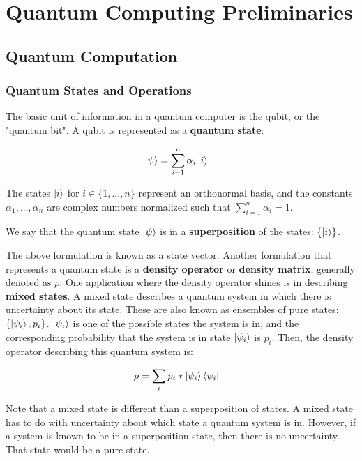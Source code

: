 \chapter{Quantum Computing Preliminaries}
\label{ch:qc-prelim}

\section{Quantum Computation}
\label{sec:qc}

\subsection{Quantum States and Operations}

The basic unit of information in a quantum computer is the qubit, or the "quantum bit". A qubit is represented as a \textbf{quantum state}:

\begin{align}
    \ket{\psi} &= \sum_{i=1}^n \alpha_i\ket{i}
\end{align}

The states $\ket{i}$ for $i \in \{1,...,n\}$ represent an orthonormal basis, and the constants $\alpha_1,...,\alpha_n$ are complex numbers normalized such that $\sum_{i=1}^n \alpha_i = 1$.

We say that the quantum state $\ket{\psi}$ is in a \textbf{superposition} of the states: $\{\ket{i}\}$.


The above formulation is known as a state vector. Another formulation that represents a quantum state is a \textbf{density operator} or \textbf{density matrix}, generally denoted as $\rho$. One application where the density operator shines is in describing \textbf{mixed states}. A mixed state describes a quantum system in which there is uncertainty about its state. These are also known as ensembles of pure states: $\{\ket{\psi_i}, p_i\}$. $\ket{\psi_i}$ is one of the possible states the system is in, and the corresponding probability that the system is in state $\ket{\psi_i}$ is $p_i$. Then, the density operator describing this quantum system is:

\begin{align}
    \rho &= \sum_{i} p_i * \ket{\psi_i}\bra{\psi_i}
\end{align}

Note that a mixed state is different than a superposition of states. A mixed state has to do with uncertainty about which state a quantum system is in. However, if a system is known to be in a superposition state, then there is no uncertainty. That state would be a pure state.


